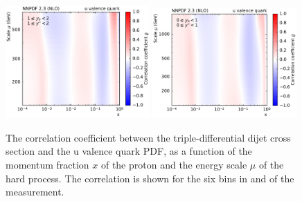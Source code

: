 \begin{figure}[htbp]
    \includegraphics[width=0.49\textwidth]{figures/pdf_constraints/corr_PTMAXEXPYS_YBYS_NLO_FINALBINS_NNPDF23_u_valence_quark_ys1_0yb1_0_cl.pdf}\hfill
    \includegraphics[width=0.49\textwidth]{figures/pdf_constraints/corr_PTMAXEXPYS_YBYS_NLO_FINALBINS_NNPDF23_u_valence_quark_ys0_0yb0_0_cl.pdf}\hfill
    \caption[Correlation between dijet cross section and u valence quark PDF]{
            The correlation coefficient between the triple-differential dijet cross
            section and the u valence quark PDF, as a function of the momentum fraction $x$ of the
            proton and the energy scale $\mu$ of the hard process. The correlation is shown
            for the six bins in \ystar and \yboost of the measurement.}

    \label{fig:pdfconstraints_u_valence_quark}
\end{figure}

